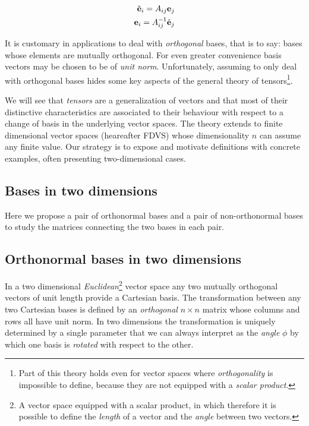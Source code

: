 \begin{subequations}
\label{eq:twoway_basis_change}
\begin{align}
\tilde{\vb{e}}_i = A_{ij} \vb{e}_j \\
\vb{e}_i = A_{ij}^{-1} \tilde{\vb{e}}_j 
\end{align}
\end{subequations}



It is customary in applications to deal with \textit{orthogonal} bases, that is to say: bases whose elements are mutually orthogonal. For even greater convenience basis vectors may be chosen to be of \textit{unit norm}. 
Unfortunately, assuming to only deal with orthogonal bases hides some key aspects of the general theory of tensors\footnote{Part of this theory holds even for vector spaces where \textit{orthogonality} is impossible to define, because they are not equipped with a \textit{scalar product}.}.   

We will see that \textit{tensors} are a generalization of vectors and that most of their distinctive characteristics are associated to their behaviour with respect to a change of basis in the underlying vector spaces. The theory extends to finite dimensional vector spaces (heareafter FDVS) whose dimensionality $n$ can assume any finite value. Our strategy is to expose and motivate definitions with concrete examples, often presenting two-dimensional cases.

\subsection{Bases in two dimensions}
Here we propose a pair of orthonormal bases and a pair of non-orthonormal bases to study the matrices connecting the two bases in each pair.  

\subsection{Orthonormal bases in two dimensions}
In a two dimensional \textit{Euclidean}\footnote{A vector space equipped with a scalar product, in which therefore it is possible to define the \textit{length} of a vector and the \textit{angle} between two vectors.} vector space any two mutually orthogonal vectors of unit length provide a Cartesian basis. The transformation between any two Cartesian bases is defined by an \textit{orthogonal} $n \times n$ matrix whose columns and rows all have unit norm. In two dimensions the transformation is uniquely determined by a single parameter that we can always interpret as the \textit{angle} $\phi$ by which one basis is \textit{rotated} with respect to the other. 

